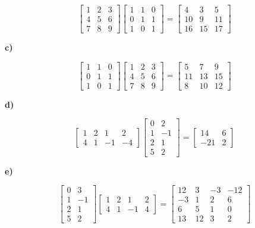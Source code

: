 \documentclass{article}
\begin{document}
\[
\begin{bmatrix}
    1 & 2 & 3\\
    4 & 5 & 6\\
    7 & 8 & 9
\end{bmatrix}
\begin{bmatrix}
    1 & 1 & 0\\
    0 & 1 & 1\\
    1 & 0 & 1
\end{bmatrix} = \begin{bmatrix}
    4 & 3 & 5\\
    10 & 9 & 11\\
    16 & 15 & 17
\end{bmatrix}
\]

\textbf{c)}

\[
\begin{bmatrix}
    1 & 1 & 0\\
    0 & 1 & 1\\
    1 & 0 & 1
\end{bmatrix}
\begin{bmatrix}
    1 & 2 & 3\\
    4 & 5 & 6\\
    7 & 8 & 9
\end{bmatrix} = \begin{bmatrix}
    5 & 7 & 9\\
    11 & 13 & 15\\
    8 & 10 & 12
\end{bmatrix}
\]

\textbf{d)}

\[
\begin{bmatrix}
    1 & 2 & 1 & 2\\
    4 & 1 & -1 & -4
\end{bmatrix}
\begin{bmatrix}
    0 & 2\\
    1 & -1\\
    2 & 1\\
    5 & 2
\end{bmatrix} = \begin{bmatrix}
    14 & 6\\
    -21 & 2
\end{bmatrix}
\]

\textbf{e)}

\[
\begin{bmatrix}
    0 & 3\\
    1 & -1\\
    2 & 1\\
    5 & 2
\end{bmatrix}
\begin{bmatrix}
    1 & 2 & 1 & 2\\
    4 & 1 & -1 & 4
\end{bmatrix} = \begin{bmatrix}
    12 & 3 & -3 & -12\\
    -3 & 1 & 2 & 6\\
    6 & 5 & 1 & 0\\
    13 & 12 & 3 & 2
\end{bmatrix}
\]
\end{document}
